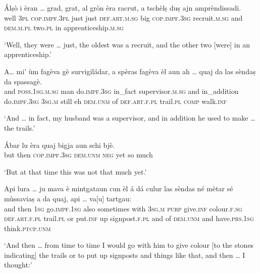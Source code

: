 \begin{linenumbers}
\gll   Álṣò i èran … grad, grat, al gròn èra racrut, a tschèlṣ duṣ ajn amprèndissadi. \\
well \textsc{3pl} \textsc{cop.impf.3pl} {} just just \textsc{def.art.m.sg} big \textsc{cop.impf.3sg} recruit.\textsc{m.sg} and  \textsc{dem.m.pl} two.\textsc{pl} in apprenticeship.\textsc{m.sg} \\
\end{linenumbers}
\medskip
\glt `Well, they were … just, the oldest was a recruit, and the other two [were] in an apprenticeship.'
\medskip

\begin{linenumbers}
\gll  A… mi' ùm fagèva gè survigiládar, a spèras fagèva èl aun ah … quaj da las sèndaṣ da spassagè.  \\
and \textsc{poss.1sg.m.sg} man do.\textsc{impf.3sg} in\_fact supervisor.\textsc{m.sg} and in\_addition do.\textsc{impf.3sg} \textsc{3sg.m} still eh {} \textsc{dem.unm} of \textsc{def.art.f.pl} trail.\textsc{pl} \textsc{comp} walk.\textsc{inf} \\
\end{linenumbers}
\medskip
\glt `And … in fact, my husband was a supervisor, and in addition he used to make … the trails.'
\medskip

\begin{linenumbers}
\gll  Ábar lu èra quaj bigja aun schi bjè.  \\
but then \textsc{cop.impf.3sg} \textsc{dem.unm} \textsc{neg} yet so much  \\
\end{linenumbers}
\medskip
\glt `But at that time this was not that much yet.'
\medskip

\begin{linenumbers}
\gll  Api lura … ju mava è mintgataun cun èl á dá culur las sèndas né mètar sé mùssaviaṣ a da quaj, api … va[u] tartgau:  \\
and then {} \textsc{1sg} go.\textsc{impf.1sg} also sometimes with \textsc{3sg.m} \textsc{purp} give.\textsc{inf} colour.\textsc{f.sg} \textsc{def.art.f.pl} trail.\textsc{pl} or put.\textsc{inf} up signpost.\textsc{f.pl} and of \textsc{dem.unm} and {} have.\textsc{prs.1sg}  think.\textsc{ptcp.unm} \\
\end{linenumbers}
\medskip
\glt `And then … from time to time I would go with him to give colour [to the stones indicating] the trails or to put up signposts and things like that, and then … I thought:'
\medskip

